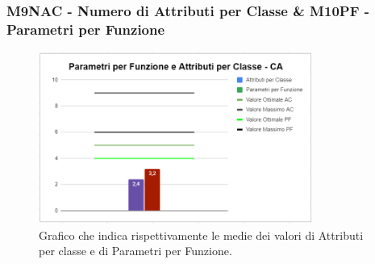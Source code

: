 \subsubsection{M9NAC - Numero di Attributi per Classe \& M10PF - Parametri per Funzione}
\begin{figure}[H]
 \centering\includegraphics[width=0.8\textwidth, height=0.8\textheight,keepaspectratio]{images/CA-Parametri.png}
  \caption{Grafico che indica rispettivamente le medie dei valori di Attributi per classe e di Parametri per Funzione.}
\end{figure}  

